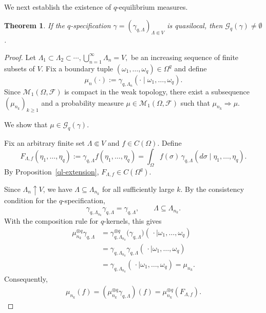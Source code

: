 \documentclass[11pt,reqno]{amsart}
\newtheorem{thm}{Theorem}
\numberwithin{equation}{section} \setcounter{tocdepth}{1}
\begin{document}
We next establish the existence of $q$-equilibrium measures.

\begin{thm}\label{qe}
	If the $q$-specification
	$\gamma=(\gamma_{q,\Lambda})_{\Lambda\Subset V}$ is quasilocal, then
	$	\mathcal G_q(\gamma)\neq\emptyset$.
	\end{thm}
\begin{proof} 	Let
	$
	\Lambda_1\subset\Lambda_2\subset\cdots,
	 \bigcup_{n=1}^\infty\Lambda_n=V,
	$
	be an increasing sequence of finite subsets of $V$. Fix a boundary
	tuple $	(\omega_1,\ldots,\omega_q)\in\Omega^q$
	and define
	\[
	\mu_n(\cdot)
	:=
	\gamma_{q,\Lambda_n}
	(\cdot\mid\omega_1,\ldots,\omega_q).
	\]
	Since $\mathcal M_1(\Omega,\mathcal F)$ is compact in the weak
	topology, there exist a subsequence $(\mu_{n_k})_{k\geq1}$ and a
	probability measure $\mu\in\mathcal M_1(\Omega,\mathcal F)$ such that
	$
	\mu_{n_k}\Longrightarrow\mu.
	$
	
	We show that $\mu\in\mathcal G_q(\gamma)$.
	
	Fix an arbitrary finite set $\Lambda\Subset V$ and
	$f\in C(\Omega)$. Define
	\[
	F_{\Lambda,f}(\eta_1,\ldots,\eta_q)
	:=
	\gamma_{q,\Lambda}f(\eta_1,\ldots,\eta_q)
	=
	\int_\Omega
	f(\sigma)\,
	\gamma_{q,\Lambda}
	(d\sigma\mid\eta_1,\ldots,\eta_q).
	\]
	By Proposition~\ref{ql-extension}, $F_{\Lambda,f}\in C(\Omega^q)$.
	
	Since $\Lambda_n\uparrow V$, we have
	$\Lambda\subseteq\Lambda_{n_k}$ for all sufficiently large $k$.
	By the consistency condition for the $q$-specification,
	\[
	\gamma_{q,\Lambda_{n_k}}
	\gamma_{q,\Lambda}
	=
	\gamma_{q,\Lambda},
	\qquad
	\Lambda\subseteq\Lambda_{n_k}.
	\]
	With the composition rule for $q$-kernels, this gives
	\[
	\begin{aligned}
		\mu_{n_k}^{\otimes q}\gamma_{q,\Lambda}
		&=
		\gamma_{q,\Lambda_{n_k}}^{\otimes q}
		\bigl(\gamma_{q,\Lambda}\bigr)
		(\,\cdot\mid\omega_1,\ldots,\omega_q)
		\\
		&=
		\gamma_{q,\Lambda_{n_k}}
		\gamma_{q,\Lambda}
		(\,\cdot\mid\omega_1,\ldots,\omega_q)
		\\
		&=
		\gamma_{q,\Lambda_{n_k}}
		(\,\cdot\mid\omega_1,\ldots,\omega_q)=
		\mu_{n_k}.
	\end{aligned}
	\]
	Consequently,
	\[
	\begin{aligned}
		\mu_{n_k}(f)=
		\left(
		\mu_{n_k}^{\otimes q}\gamma_{q,\Lambda}
		\right)(f)=
		\mu_{n_k}^{\otimes q}
		\left(
		F_{\Lambda,f}
		\right).
	\end{aligned}
	\]
	

\end{proof}
\end{document}
